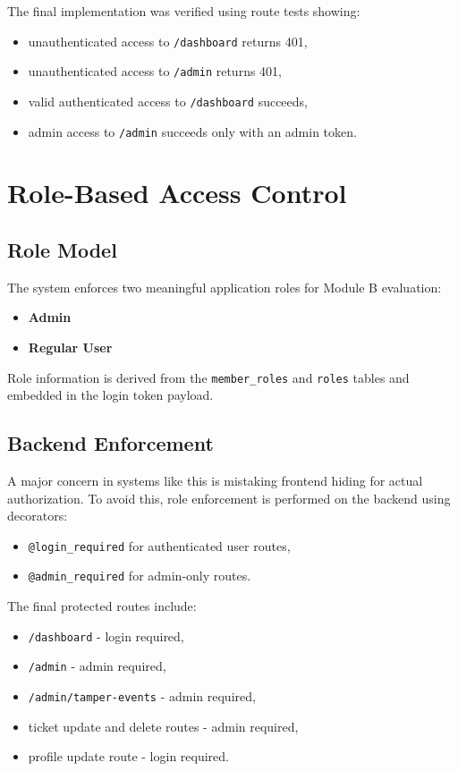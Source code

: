 \documentclass[12pt,a4paper]{article}
\begin{document}
The final implementation was verified using route tests showing:
\begin{itemize}[leftmargin=1.5em]
    \item unauthenticated access to \texttt{/dashboard} returns 401,
    \item unauthenticated access to \texttt{/admin} returns 401,
    \item valid authenticated access to \texttt{/dashboard} succeeds,
    \item admin access to \texttt{/admin} succeeds only with an admin token.
\end{itemize}

\section{Role-Based Access Control}
\subsection{Role Model}
The system enforces two meaningful application roles for Module B evaluation:
\begin{itemize}[leftmargin=1.5em]
    \item \textbf{Admin}
    \item \textbf{Regular User}
\end{itemize}

Role information is derived from the \texttt{member\_roles} and \texttt{roles} tables and embedded in the login token payload.

\subsection{Backend Enforcement}
A major concern in systems like this is mistaking frontend hiding for actual authorization. To avoid this, role enforcement is performed on the backend using decorators:
\begin{itemize}[leftmargin=1.5em]
    \item \texttt{@login\_required} for authenticated user routes,
    \item \texttt{@admin\_required} for admin-only routes.
\end{itemize}

The final protected routes include:
\begin{itemize}[leftmargin=1.5em]
    \item \texttt{/dashboard} - login required,
    \item \texttt{/admin} - admin required,
    \item \texttt{/admin/tamper-events} - admin required,
    \item ticket update and delete routes - admin required,
    \item profile update route - login required.
\end{itemize}
\end{document}
